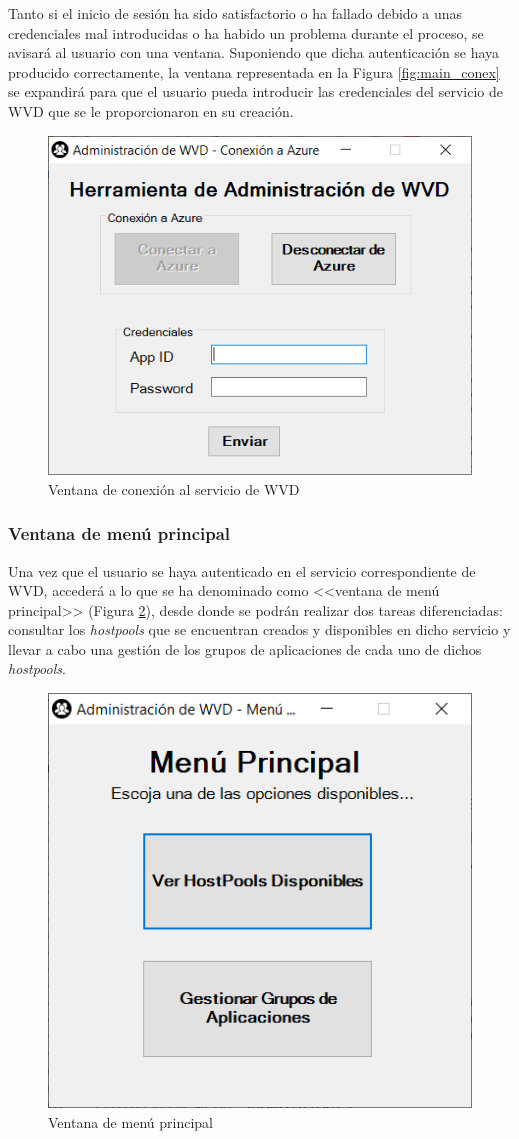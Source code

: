 Tanto si el inicio de sesión ha sido satisfactorio o ha fallado debido a unas credenciales mal introducidas o ha habido un problema durante el proceso, se avisará al usuario con una ventana. Suponiendo que dicha autenticación se haya producido correctamente, la ventana representada en la Figura \ref{fig:main_conex} se expandirá para que el usuario pueda introducir las credenciales del servicio de \acs{WVD} que se le proporcionaron en su creación.

\begin{figure}[h]
  \centering
  \includegraphics[width=0.6\linewidth]{figures/images/script/main_expand.PNG}
  \caption{Ventana de conexión al servicio de \acs{WVD}}
  \label{fig:main_expand}
\end{figure}

\subsubsection{Ventana de menú principal}

Una vez que el usuario se haya autenticado en el servicio correspondiente de \acs{WVD}, accederá a lo que se ha denominado como <<ventana de menú principal>> (Figura \ref{fig:menu_ppal}), desde donde se podrán realizar dos tareas diferenciadas: consultar los \textit{hostpools} que se encuentran creados y disponibles en dicho servicio y llevar a cabo una gestión de los grupos de aplicaciones de cada uno de dichos \textit{hostpools}.

\begin{figure}[h]
  \centering
  \includegraphics[width=0.6\linewidth]{figures/images/script/menu_ppal.PNG}
  \caption{Ventana de menú principal}
  \label{fig:menu_ppal}
\end{figure}

